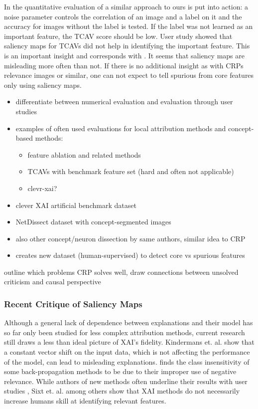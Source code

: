 In the quantitative evaluation of \cite{Kim2018} a similar approach to ours is put into action: 
a noise parameter controls the correlation of an image and a label on it and the accuracy for images without the label is tested. If the label was not learned as an important feature, the TCAV score should be low. User study showed that saliency maps for TCAVs did not help in identifying the important feature. This is an important insight and corresponds with \cite{Sixt2022a}. It seems that saliency maps are misleading more often than not. If there is no additional insight as with CRPs relevance images or similar, one can not expect to tell spurious from core features only using saliency maps. 

\begin{itemize}
      \item differentiate between numerical evaluation and evaluation through user studies
      \item examples of often used evaluations for local attribution methods and concept-based methods:
            \begin{itemize}
                  \item feature ablation and related methods
                  \item TCAVs \cite{Kim2018} with benchmark feature set (hard and often not applicable)
                  \item clevr-xai? \cite{Arras2022} 
            \end{itemize}
      \item clever XAI artificial benchmark dataset \cite{Arras2022}
      \item NetDissect dataset with concept-segmented images \cite{Bau2017}
      \item also other concept/neuron dissection by same authors, similar idea to CRP \cite{Bau2020}
      \item creates new dataset (human-supervised) to detect core vs spurious features \cite{Singla2022}
\end{itemize}
{\color{red} outline which problems CRP solves well, draw connections between unsolved criticism and causal perspective}

\subsubsection{Recent Critique of Saliency Maps}

Although a general lack of dependence between explanations and their model \cite{Adebayo2018,Karimi2023} has so far only been studied for less complex attribution methods, current research still draws a less than ideal picture of XAI's fidelity.
Kindermans et. al. \cite{Kindermans2019} show that a constant vector shift on the input data, which is not affecting the performance of the model, can lead to misleading explanations. \cite{Sixt2020} finds the class insensitivity of some back-propagation methods to be due to their improper use of negative relevance.
While authors of new methods often underline their results with user studies , Sixt et. al. \cite{Sixt2022a} among others  show that XAI methods do not necessarily increase humans skill at identifying relevant features.

